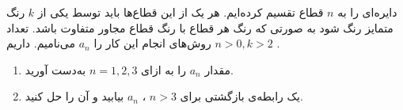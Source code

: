 \EXERCISE
دایره‌ای را به
$n$
قطاع تقسیم کرده‌ایم. هر یک از این قطاع‌ها باید توسط یکی از
$k$
رنگ متمایز رنگ شود به صورتی که رنگ هر قطاع با رنگ قطاع مجاور متفاوت باشد. تعداد روش‌های انجام این کار را
$a_n$
می‌نامیم. داریم
$n > 0, k > 2$
.
\begin{enumerate}
\item
مقدار
$a_n$
را به ازای
$n = 1, 2, 3$
به‌دست آورید.
\item
یک رابطه‌ی بازگشتی برای
$n > 3$
،
$a_n$
بیابید و آن را حل کنید.
\end{enumerate}